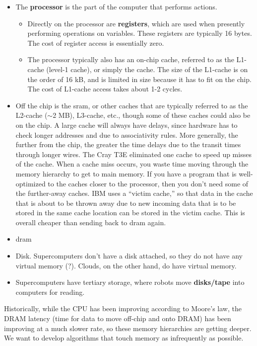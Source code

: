 \documentclass[10pt]{article}
\begin{document}
\begin{flushleft}
\begin{itemize}
\item The \textbf{processor} is the part of the computer that performs actions. 
	\begin{itemize}
	\item Directly on the processor are \textbf{registers}, which are used when presently performing operations on variables. These registers are typically 16 bytes. The cost of register access is essentially zero.
	\item The processor typically also has an on-chip cache, referred to as the L1-cache (level-1 cache), or simply the cache. The size of the L1-cache is on the order of 16 kB, and is limited in size because it has to fit on the chip. The cost of L1-cache access takes about 1-2 cycles.
	\end{itemize}
\item Off the chip is the \gls{sram}, or other caches that are typically referred to as the L2-cache (\(\sim\)2 MB), L3-cache, etc., though some of these caches could also be on the chip. A large cache will always have delays, since hardware has to check longer addresses and due to associativity rules. More generally, the further from the chip, the greater the time delays due to the transit times through longer wires. The Cray T3E eliminated one cache to speed up misses of the cache. When a cache miss occurs, you waste time moving through the memory hierarchy to get to main memory. If you have a program that is well-optimized to the caches closer to the processor, then you don't need some of the further-away caches. IBM uses a ``victim cache,'' so that data in the cache that is about to be thrown away due to new incoming data that is to be stored in the same cache location can be stored in the victim cache. This is overall cheaper than sending back to \gls{dram} again.
\item \gls{dram}
\item Disk. Supercomputers don't have a disk attached, so they do not have any virtual memory (?). Clouds, on the other hand, do have virtual memory.
\item Supercomputers have tertiary storage, where robots move \textbf{disks/tape} into computers for reading.
\end{itemize}

Historically, while the CPU has been improving according to Moore's law, the DRAM latency (time for data to move off-chip and onto DRAM) has been improving at a much slower rate, so these memory hierarchies are getting deeper. We want to develop algorithms that touch memory as infrequently as possible. 


\end{flushleft}
\end{document}
